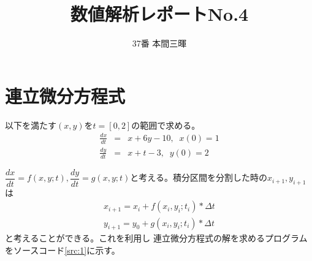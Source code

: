 \documentclass[titlepage]{jsarticle}
\begin{document}
\title{数値解析レポートNo.4}
\author{37番 本間三暉}
\date{}
\maketitle

\section{連立微分方程式}
以下を満たす$(x,y)$を$t=[0,2]$の範囲で求める。
\begin{eqnarray}
	\frac{dx}{dt} &=& x + 6y -10,\; \; x(0) = 1\nonumber \\
	\frac{dy}{dt} &=& x + t -3, \;\; y(0) = 2 \nonumber
\end{eqnarray}

$\dfrac{dx}{dt} = f(x,y;t),\dfrac{dy}{dt} = g(x,y;t)$と考える。積分区間を分割した時の$x_{i+1},y_{i+1}$は
\begin{eqnarray}
	x_{i+1} = x_i + f(x_i,y_i;t_i) * \Delta t \nonumber \\
	y_{i+1} = y_0 + g(x_i,y_i;t_i) * \Delta t \nonumber
\end{eqnarray}
と考えることができる。これを利用し
連立微分方程式の解を求めるプログラムをソースコード\ref{src:1}に示す。
\end{document}
